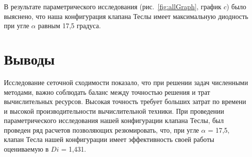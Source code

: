 \documentclass[10pt,a4paper]{book}
\begin{document}
    В результате параметрического исследования (рис.~\ref{fig:allGraph}, график $c$) было выяснено, что наша конфигурация клапана Теслы имеет максимальную диодность при угле $ \alpha $ равным 17,5 градуса. 
    
    \section{Выводы}
    
    Исследование сеточной сходимости показало, что при решении задач численными методами, важно соблюдать баланс между точностью решения и трат вычислительных ресурсов. Высокая точность требует больших затрат по времени и высокой производительности вычислительной техники. При проведении параметрического исследования нашей конфигурации клапана Теслы, был проведен ряд расчетов позволяющих резюмировать, что, при угле $\alpha$  = 17,5\textdegree, клапан Тесла нашей конфигурации имеет эффективность своей работы оцениваемую в $Di$ = 1,431.
    
    
    \vspace*{10mm plus 2mm minus 2mm}
    
    \LITERRUS
    
    
    
    
    
    
    
    
    
    \medskip
    
    \DateRU  
    
    \bigskip
    \bigskip
    
    \MakeAuthorsInfoRU
    
    
    \bigskip
    \bigskip
    
\end{document}
